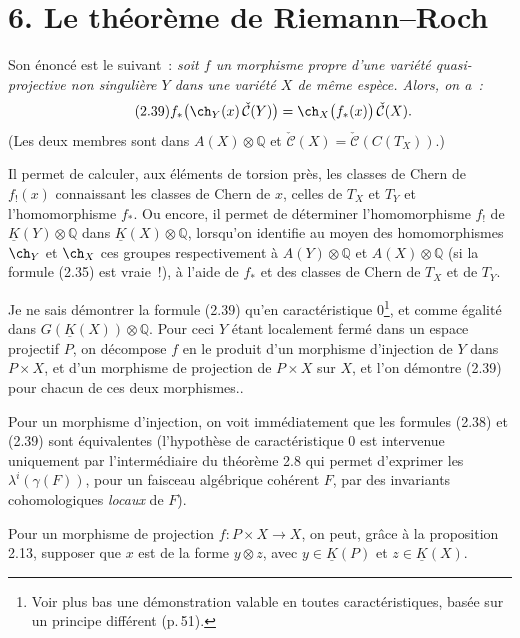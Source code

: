 \section*{6. Le théorème de Riemann--Roch}

Son énoncé est le suivant~: \emph{soit \(f\) un morphisme propre d'une variété quasi-projective non singulière \(Y\) dans une variété \(X\) de même espèce. Alors, on a~:}
\begin{equation}\tag{2.39}
 f_*\bigl(\ch_Y(x)\,\check{\mathcal C}(Y)\bigr)
 =
 \ch_X\bigl(f_*(x)\bigr)\,\check{\mathcal C}(X).
\end{equation}
(Les deux membres sont dans \(A(X)\otimes\mathbb Q\) et \(\check{\mathcal C}(X)=\check{\mathcal C}(C(T_X))\).)

Il permet de calculer, aux éléments de torsion près, les classes de Chern de \(f_!(x)\) connaissant les classes de Chern de \(x\), celles de \(T_X\) et \(T_Y\) et l'homomorphisme \(f_*\). Ou encore, il permet de déterminer l'homomorphisme
\(f_!\) de \(\underline K(Y)\otimes\mathbb Q\) dans \(\underline K(X)\otimes\mathbb Q\), lorsqu'on identifie au moyen des homomorphismes \(\ch_Y\) et \(\ch_X\) ces groupes respectivement à \(A(Y)\otimes\mathbb Q\) et \(A(X)\otimes\mathbb Q\) (si la formule (2.35) est vraie~!), à l'aide de \(f_*\) et des classes de Chern de \(T_X\) et de \(T_Y\).

Je ne sais démontrer la formule (2.39) qu'en caractéristique \(0\)\footnote{Voir plus bas une démonstration valable en toutes caractéristiques, basée sur un principe différent (p.\,51).}, et comme égalité dans \(G(\underline K(X))\otimes\mathbb Q\). Pour ceci \(Y\) étant localement fermé dans un espace projectif \(P\), on décompose \(f\) en le produit d'un morphisme d'injection de \(Y\) dans \(P\times X\), et d'un morphisme de projection de \(P\times X\) sur \(X\), et l'on démontre (2.39) pour chacun de ces deux morphismes..

Pour un morphisme d'injection, on voit immédiatement que les formules (2.38) et (2.39) sont équivalentes (l'hypothèse de caractéristique \(0\) est intervenue uniquement par l'intermédiaire du théorème 2.8 qui permet d'exprimer les \(\lambda^i(\gamma(F))\), pour un faisceau algébrique cohérent \(F\), par des invariants cohomologiques \emph{locaux} de \(F\)).

Pour un morphisme de projection \(f:P\times X\longrightarrow X\), on peut, grâce à la proposition 2.13, supposer que \(x\) est de la forme \(y\otimes z\), avec \(y\in\underline K(P)\) et \(z\in\underline K(X)\).
